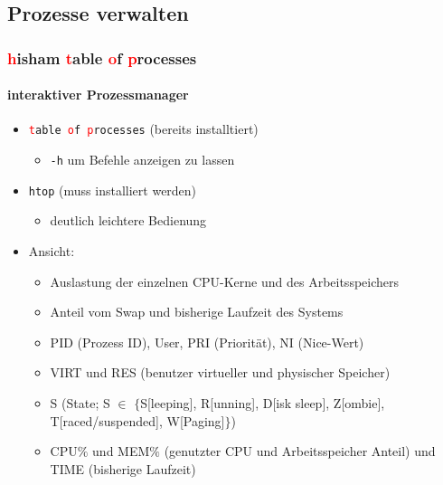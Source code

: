 \documentclass[12pt,utf8]{beamer}
\begin{document}
\subsection{Prozesse verwalten}
\begin{frame}
\frametitle{\textcolor{red}{h}isham \textcolor{red}{t}able \textcolor{red}{o}f \textcolor{red}{p}rocesses}
\framesubtitle{interaktiver Prozessmanager}
\begin{itemize}
	\item \texttt{\textcolor{red}{t}able \textcolor{red}{o}f \textcolor{red}{p}rocesses} (bereits installtiert)
	\begin{itemize}[<+->]
		\item {\scriptsize \texttt{-h} um Befehle anzeigen zu lassen}
	\end{itemize}
	\item \texttt{htop} (muss installiert werden)
	\begin{itemize}[<+->]
		\item {\scriptsize deutlich leichtere Bedienung}
	\end{itemize}
	\item Ansicht:
	\begin{itemize}[<+->]
		\item {\scriptsize Auslastung der einzelnen CPU-Kerne und des Arbeitsspeichers}
		\item {\scriptsize Anteil vom Swap und bisherige Laufzeit des Systems}
		\item {\scriptsize PID (Prozess ID), User, PRI (Priorität), NI (Nice-Wert)}
		\item {\scriptsize VIRT und RES (benutzer virtueller und physischer Speicher)}
		\item {\scriptsize S (State; S $\in$ $\{${\footnotesize S[leeping], R[unning], D[isk sleep], Z[ombie], T[raced/suspended], W[Paging]}$\}$)}
		\item {\scriptsize CPU$\%$ und MEM$\%$ (genutzter CPU und Arbeitsspeicher Anteil) und TIME (bisherige Laufzeit)}
	\end{itemize}
\end{itemize}
\end{frame}
\end{document}
